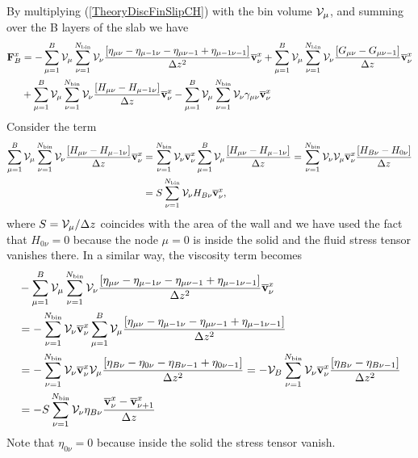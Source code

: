 \documentclass[b5paper,openright,10pt]{book}
\begin{document}
\begin{appendices}
By  multiplying  (\ref{TheoryDiscFinSlipCH})  with  the  bin  volume  ${\cal
  V}_\mu$, and summing over the B layers of the slab we have
\begin{align}
{\bf F}^x_B
&=-\sum^{B}_{\mu=1}{\cal V}_\mu \sum_{\nu=1}^{N_{\rm bin}} {\cal V}_\nu \frac{\left[\eta_{\mu\nu}-\eta_{\mu-1\nu}-\eta_{\mu\nu-1}+\eta_{\mu-1\nu-1}\right]}{\Delta z^2}\overline{\bf v}^x_\nu
+\sum^{B}_{\mu=1}{\cal V}_\mu \sum_{\nu=1}^{N_{\rm bin}} {\cal V}_\nu\frac{\left[G_{\mu\nu}-G_{\mu\nu-1}\right]}{\Delta z}\overline{\bf v}^x_\nu
\nonumber\\
&+\sum^{B}_{\mu=1}{\cal V}_\mu \sum_{\nu=1}^{N_{\rm bin}} {\cal V}_\nu\frac{\left[H_{\mu\nu}-H_{\mu-1\nu}\right]}{\Delta z}\overline{\bf v}^x_\nu
-\sum^{B}_{\mu=1}{\cal V}_\mu \sum_{\nu=1}^{N_{\rm bin}} {\cal V}_\nu\gamma_{\mu\nu}\overline{\bf v}^x_\nu
\label{Layer}
\end{align}
Consider the term
\begin{align}
  \sum^{B}_{\mu=1}{\cal V}_\mu \sum_{\nu=1}^{N_{\rm bin}} {\cal V}_\nu\frac{\left[H_{\mu\nu}-H_{\mu-1\nu}\right]}{\Delta z}\overline{\bf v}^x_\nu 
&= \sum_{\nu=1}^{N_{\rm bin}} {\cal V}_\nu \overline{\bf v}^x_\nu 
\sum^{B}_{\mu=1}{\cal V}_\mu \frac{\left[H_{\mu\nu}-H_{\mu-1\nu}\right]}{\Delta z}
 =\sum_{\nu=1}^{N_{\rm bin}} {\cal V}_\nu {\cal V}_\mu \overline{\bf v}^x_\nu \frac{\left[H_{B\nu}-H_{0\nu}\right]}{\Delta z}
\nonumber\\
& =S\sum_{\nu=1}^{N_{\rm bin}} {\cal V}_\nu H_{B\nu}\overline{\bf v}^x_\nu ,
\end{align}
where $S={\cal  V}_\mu/\Delta z$ coincides  with the area of  the wall
and we have  used the fact that $H_{0\nu}=0$ because  the node $\mu=0$
is inside the solid and the  fluid stress tensor vanishes there.  In a
similar way, the viscosity term becomes
\begin{align}
&  -\sum^{B}_{\mu=1}{\cal V}_\mu \sum_{\nu=1}^{N_{\rm bin}} {\cal V}_\nu \frac{\left[\eta_{\mu\nu}-\eta_{\mu-1\nu}-\eta_{\mu\nu-1}+\eta_{\mu-1\nu-1}\right]}{\Delta z^2}\overline{\bf v}^x_\nu
  \nonumber \\
  &= -\sum_{\nu=1}^{N_{\rm bin}} {\cal V}_\nu \overline{\bf v}^x_\nu
\sum^{B}_{\mu=1}{\cal V}_\mu 
\frac{\left[\eta_{\mu\nu}-\eta_{\mu-1\nu}-\eta_{\mu\nu-1}+\eta_{\mu-1\nu-1}\right]}{\Delta z^2}
\nonumber\\
& = -\sum_{\nu=1}^{N_{\rm bin}} {\cal V}_\nu \overline{\bf v}^x_\nu
{\cal V}_\mu 
\frac{\left[\eta_{B\nu}-\eta_{0\nu}-\eta_{B\nu-1}+\eta_{0\nu-1}\right]}{\Delta z^2}
=   -{\cal V}_{B}\sum_{\nu=1}^{N_{\rm bin}} {\cal V}_\nu \overline{\bf v}^x_\nu
\frac{\left[\eta_{B\nu}-\eta_{B\nu-1}\right]}{\Delta z^2}
\nonumber\\
&=   -S\sum_{\nu=1}^{N_{\rm bin}} {\cal V}_\nu 
\eta_{B\nu}\frac{\overline{\bf v}^x_\nu-\overline{\bf v}^x_{\nu+1}}{\Delta z}
\end{align}
Note  that $\eta_{0\nu}=0$  because  inside the  solid the  stress
tensor vanish.


\end{appendices}
\end{document}
